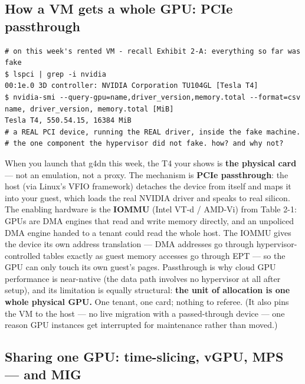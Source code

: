 \subsection*{How a VM gets a whole GPU: PCIe passthrough}

\begin{terminalbox}
\begin{Verbatim}[breaklines=true,breakanywhere=true,fontsize=\small,formatcom=\color{tbbtermfg},codes=\tbbcodeactive]
# on this week's rented VM - recall Exhibit 2-A: everything so far was fake
$ lspci | grep -i nvidia
00:1e.0 3D controller: NVIDIA Corporation TU104GL [Tesla T4]
$ nvidia-smi --query-gpu=name,driver_version,memory.total --format=csv
name, driver_version, memory.total [MiB]
Tesla T4, 550.54.15, 16384 MiB
# a REAL PCI device, running the REAL driver, inside the fake machine.
# the one component the hypervisor did not fake. how? and why not?
\end{Verbatim}
\end{terminalbox}

When you launch that g4dn this week, the T4 your  shows is \textbf{the physical card} — not an emulation, not a proxy. The mechanism is \textbf{PCIe passthrough}: the host (via Linux's VFIO framework) detaches the device from itself and maps it into your guest, which loads the real NVIDIA driver and speaks to real silicon. The enabling hardware is the \textbf{IOMMU} (Intel VT-d / AMD-Vi) from Table 2-1: GPUs are DMA engines that read and write memory directly, and an unpoliced DMA engine handed to a tenant could read the whole host. The IOMMU gives the device its own address translation — DMA addresses go through hypervisor-controlled tables exactly as guest memory accesses go through EPT — so the GPU can only touch its own guest's pages. Passthrough is why cloud GPU performance is near-native (the data path involves no hypervisor at all after setup), and its limitation is equally structural: \textbf{the unit of allocation is one whole physical GPU.} One tenant, one card; nothing to referee. (It also pins the VM to the host — no live migration with a passed-through device — one reason GPU instances get interrupted for maintenance rather than moved.)

\subsection*{Sharing one GPU: time-slicing, vGPU, MPS — and MIG}

